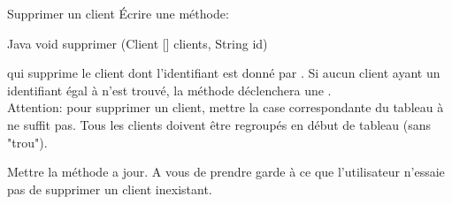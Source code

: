 \documentclass[a4paper,11pt]{article}
\begin{document}
\begin{Exercice}{Supprimer un client}
		\'Ecrire une m\'ethode:
				
		\begin{Code}{Java}
		void supprimer (Client [] clients, String id)
		\end{Code}

qui supprime le client dont l'identifiant est donn\'e par . Si aucun client ayant un identifiant \'egal \`a  n'est trouv\'e, la m\'ethode d\'eclenchera une . \\

Attention: pour supprimer un client, mettre la case correspondante du tableau \`a  ne suffit pas. Tous les clients doivent \^etre regroup\'es en d\'ebut de tableau (sans "trou").


Mettre la m\'ethode  a jour. A vous de prendre garde \`a ce que l'utilisateur n'essaie pas de supprimer un client inexistant.
	
\end{Exercice}

	
	
\end{document}
